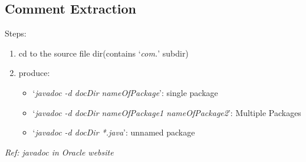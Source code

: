 \documentclass[12pt]{article}
\begin{document}
\subsection{Comment Extraction}
Steps:
\begin{enumerate}
    \item cd to the source file dir(contains `\emph{com.}' subdir)
    \item produce:
    \begin{itemize}
        \item `\emph{javadoc -d docDir nameOfPackage}': single package
        \item `\emph{javadoc -d docDir nameOfPackage1 nameOfPackage2}': Multiple Packages
        \item `\emph{javadoc -d docDir *.java}': unnamed package
    \end{itemize}
\end{enumerate}
\textit{Ref: javadoc in Oracle website}
\end{document}
